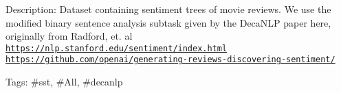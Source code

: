 Description\+: Dataset containing sentiment trees of movie reviews. We use the modified binary sentence analysis subtask given by the Deca\+N\+LP paper here, originally from Radford, et. al \href{https://nlp.stanford.edu/sentiment/index.html}{\tt https\+://nlp.\+stanford.\+edu/sentiment/index.\+html} \href{https://github.com/openai/generating-reviews-discovering-sentiment/}{\tt https\+://github.\+com/openai/generating-\/reviews-\/discovering-\/sentiment/}

Tags\+: \#sst, \#\+All, \#decanlp 